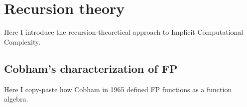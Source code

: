 \chapter{Recursion theory}
\label{chap:recursion-theory}
Here I introduce the recursion-theoretical approach to Implicit Computational Complexity.

\section{Cobham's characterization of FP}
\label{sec:cobham-characterization}
Here I copy-paste how Cobham in 1965 defined FP functions as a function algebra.
